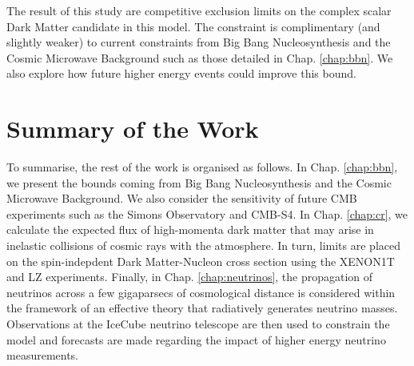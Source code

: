 The result of this study are competitive exclusion limits on the complex scalar Dark Matter candidate in this model. The constraint is complimentary (and slightly weaker) to current constraints from Big Bang Nucleosynthesis and the Cosmic Microwave Background such as those detailed in Chap. \ref{chap:bbn}. We also explore how future higher energy events could improve this bound.

\section{Summary of the Work}

To summarise, the rest of the work is organised as follows. In Chap. \ref{chap:bbn}, we present the bounds coming from Big Bang Nucleosynthesis and the Cosmic Microwave Background. We also consider the sensitivity of future CMB experiments such as the Simons Observatory and CMB-S4. In Chap. \ref{chap:cr}, we calculate the expected flux of high-momenta dark matter that may arise in inelastic collisions of cosmic rays with the atmosphere. In turn, limits are placed on the spin-indepdent Dark Matter-Nucleon cross section using the XENON1T and LZ experiments. Finally, in Chap. \ref{chap:neutrinos}, the propagation of neutrinos across a few gigaparsecs of cosmological distance is considered within the framework of an effective theory that radiatively generates neutrino masses. Observations at the IceCube neutrino telescope are then used to constrain the model and forecasts are made regarding the impact of higher energy neutrino measurements.